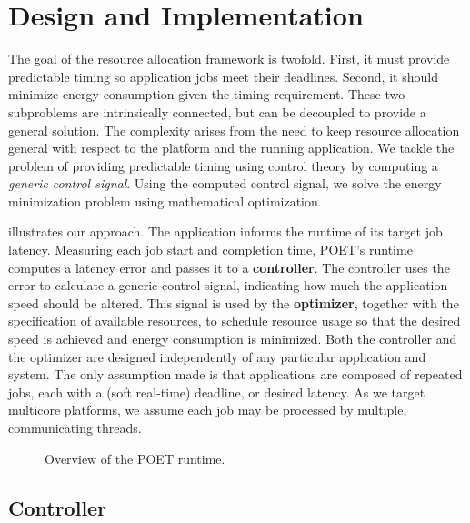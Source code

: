 \section{Design and Implementation}
\label{sec:poet-framework}

The goal of the resource allocation framework is twofold. 
First, it must provide predictable timing so application jobs meet their deadlines.
Second, it should minimize energy consumption given the timing requirement.
These two subproblems are intrinsically connected, but can be decoupled to provide a general solution.
The complexity arises from the need to keep resource allocation general with respect to the platform and the running application.
We tackle the problem of providing predictable timing using control theory by computing a \emph{generic control signal}.
Using the computed control signal, we solve the energy minimization problem using mathematical optimization.

 illustrates our approach.
The application informs the runtime of its target job latency.
Measuring each job start and completion time, POET's runtime computes a latency error and passes it to a \textbf{controller}.
The controller uses the error to calculate a generic control signal, indicating how much the application speed should be altered.
This signal is used by the \textbf{optimizer}, together with the specification of available resources, to schedule resource usage so that the desired speed is achieved and energy consumption is minimized.
Both the controller and the optimizer are designed independently of any particular application and system.
The only assumption made is that applications are composed of repeated jobs, each with a (soft real-time) deadline, or desired latency.
As we target multicore platforms, we assume each job may be processed by multiple, communicating threads.

\begin{figure}[t]
  \centering
  
  \caption{Overview of the POET runtime.}
  \label{fig:poet-runtime}
\end{figure}


\subsection{Controller}
\label{sec:controllerdesign}

